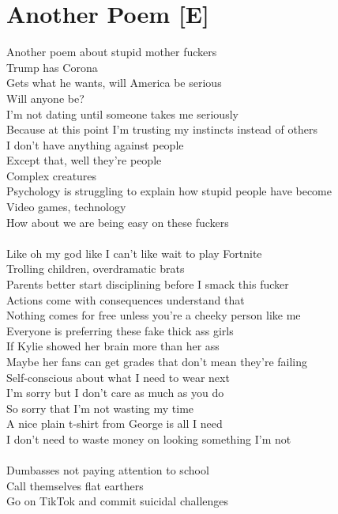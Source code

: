 \documentclass[12pt, b5paper, oneside]{book}
\begin{document}
\section{Another Poem [E]}
Another poem about stupid mother fuckers
\\Trump has Corona
\\Gets what he wants, will America be serious
\\Will anyone be?
\\I'm not dating until someone takes me seriously
\\Because at this point I'm trusting my instincts instead of others
\\I don't have anything against people
\\Except that, well they're people
\\Complex creatures
\\Psychology is struggling to explain how stupid people have become
\\Video games, technology
\\How about we are being easy on these fuckers
%
\\\\Like oh my god like I can't like wait to play Fortnite
\\Trolling children, overdramatic brats
\\Parents better start disciplining before I smack this fucker
\\Actions come with consequences understand that
\\Nothing comes for free unless you're a cheeky person like me
\\Everyone is preferring these fake thick ass girls
\\If Kylie showed her brain more than her ass
\\Maybe her fans can get grades that don't mean they're failing
\\Self-conscious about what I need to wear next
\\I'm sorry but I don't care as much as you do
\\So sorry that I'm not wasting my time
\\A nice plain t-shirt from George is all I need
\\I don't need to waste money on looking something I'm not
%
\\\\Dumbasses not paying attention to school
\\Call themselves flat earthers
\\Go on TikTok and commit suicidal challenges
\end{document}
